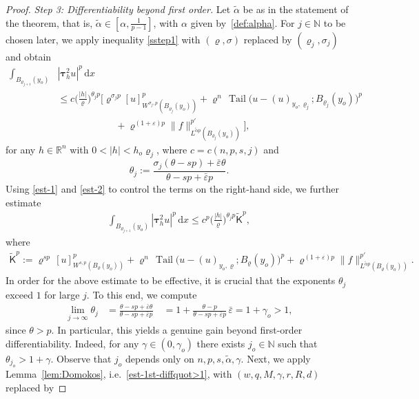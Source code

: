 \documentclass[10pt,letterpaper]{amsart}
\theoremstyle{definition}
\numberwithin{theorem}{section}
\numberwithin{equation}{section}
\newcommand{\N}{\ensuremath{\mathbb{N}}}
\newcommand{\R}{\ensuremath{\mathbb{R}}}
\newcommand{\1}{\ensuremath{\mathds{1}}}
\newcommand{\dx}{\mathrm{d}x}
\newcommand\sfK{{\boldsymbol{\mathsf K}}}
\renewcommand{\epsilon}{\varepsilon}
\renewcommand{\rho}{\varrho}
\renewcommand{\epsilon}{\varepsilon}
\renewcommand{\rho}{\varrho}
\DeclareMathOperator{\Tail}{Tail}
\numberwithin{equation}{section}
\begin{document}
\begin{proof}
\smallskip
\noindent
\textit{Step 3: Differentiability beyond first order.}
Let $\tilde{\alpha}$ be as in the statement of the theorem, that is,
$\tilde{\alpha}\in [\alpha,\frac{1}{p-1}]$, with $\alpha$ given by~\eqref{def:alpha}. For $j \in \N$ to be chosen later, we apply inequality \eqref{sstep1} with $(\rho,\sigma)$ replaced by $(\rho_j,\sigma_j)$  and obtain 
\begin{align*}
    \int_{B_{\rho_{j+1}}(y_o)} & |\boldsymbol{\tau}_h^2 u|^p \,\dx \\
    &\leq
    c \Big(\frac{|h|}{\rho}\Big)^{\theta_j p}
    \Big[
        \rho^{\sigma_j p}
        [u]_{W^{\sigma_j,p}(B_{\rho_j}(y_o))}^p
        + \rho^{n}\,
        \Tail\big(u-(u)_{y_o,\rho_j};B_{\rho_j}(y_o)\big)^p \\
    &\qquad\qquad\qquad
        + \rho^{(1+\varepsilon)p}
        \|f\|_{L^{\tilde \alpha p}(B_{\rho_j}(y_o))}^{p'}
    \Big],
\end{align*}
for any $h\in\R^n$ with $0<|h|<h_o\rho_j$, 
where $c=c(n,p,s,j)$ and 
\[
\theta_j
:=
\frac{\sigma_j(\theta-sp)+\bar\epsilon\theta}{\theta-sp+\bar\epsilon p}.
\]
Using \eqref{est-1} and \eqref{est-2} to control the terms on the right-hand
side, we further estimate
\begin{align}\label{second-diff}
    \int_{B_{\rho_{j+1}}(y_o)} |\boldsymbol{\tau}_h^2 u|^p \,\dx
    \le
    c^p \Big(\frac{|h|}{\rho}\Big)^{\theta_j p}
    \widetilde{\sfK}^p,
\end{align}
where
\begin{align*}
    \widetilde{\sfK}^p
    :=
    \rho^{s p}\,[u]_{W^{s,p}(B_{\rho}(y_o))}^p
    + \rho^{n}\,\Tail\big(u-(u)_{y_o,\rho};B_{\rho}(y_o)\big)^p
    + \rho^{(1+\varepsilon)p}
    \|f\|_{L^{\tilde\alpha p}(B_{\rho}(y_o))}^{p'} .
\end{align*}
In order for the above estimate to be effective, it is crucial that the
exponents \(\theta_j\) exceed \(1\) for large \(j\).
To this end, we compute
\begin{align*}
    \lim_{j\to\infty}\theta_j
    &=
    \frac{\theta-sp+\bar\epsilon\theta}{\theta-sp+\bar\epsilon p} \quad 
    =
    1+\frac{\theta-p}{\theta-sp+\bar\epsilon p}\,\bar\epsilon =
    1+\gamma_o
    >
    1,
\end{align*}
since \(\theta>p\). In particular, this yields a genuine gain beyond first-order
differentiability. Indeed, for any \(\gamma\in(0,\gamma_o)\) there exists \(j_o\in\mathbb{N}\)
such that \(\theta_{j_o}>1+\gamma\). Observe that $j_o$ depends only on $n,p,s, \tilde \alpha,\gamma$.  Next, we apply Lemma~\ref{lem:Domokos}, i.e.~\eqref{est-1st-diffquot>1}, with $(w,q,M,\gamma,r,R,d)$ replaced by 

\end{proof}
\end{document}
